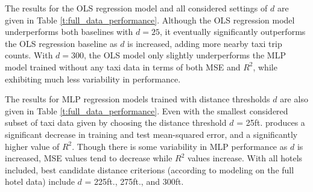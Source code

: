 \documentclass[useAMS, usenatbib]{biom}
\begin{document}
The results for the OLS regression model and all considered settings of $d$ are given in Table \ref{t:full_data_performance}. Although the OLS regression model underperforms both baselines with $d = 25$, it eventually significantly outperforms the OLS regression baseline as $d$ is increased, adding more nearby taxi trip counts. With $d = 300$, the OLS model only slightly underperforms the MLP model trained without any taxi data in terms of both MSE and $R^2$, while exhibiting much less variability in performance.

The results for MLP regression models trained with distance thresholds $d$ are also given in Table \ref{t:full_data_performance}. Even with the smallest considered subset of taxi data given by choosing the distance threshold $d$ = 25ft. produces a significant decrease in training and test mean-squared error, and a significantly higher value of $R^2$. Though there is some variability in MLP performance as $d$ is increased, MSE values tend to decrease while $R^2$ values increase. With all hotels included, best candidate distance criterions (according to modeling on the full hotel data) include $d$ = 225ft., 275ft., and 300ft.
\end{document}
